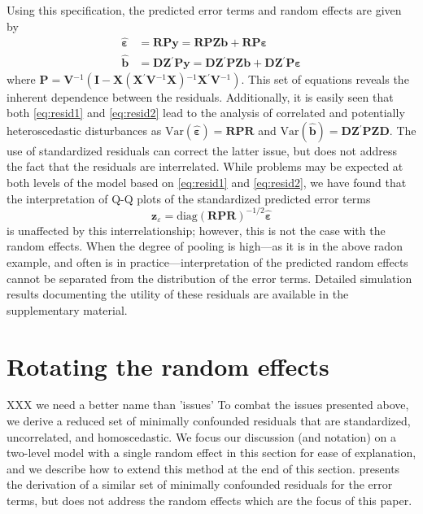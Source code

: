\documentclass{article} %
\newcommand{\hh}[1]{{\color{orange} #1}}
\newcommand{\al}[1]{{\color{red} #1}}
\newcommand{\inv}{\ensuremath{^{-1}}}
\newcommand{\trans}{\ensuremath{^\prime}}
\newcommand{\var}{\ensuremath{\mathrm{Var}}}
\begin{document}
Using this specification, the predicted error terms and random effects are given by 
%
\begin{align}
\widehat{\bm{\varepsilon}} &= \bm{RPy} = \bm{RPZb} + \bm{RP \varepsilon} \label{eq:resid1}\\
\widehat{\bm{b}} &= \bm{DZ}\trans \bm{Py} = \bm{DZ}\trans \bm{PZb} + \bm{DZ}\trans \bm{P \varepsilon} \label{eq:resid2}
\end{align}
%
where $\bm{P} = \bm{V}\inv( \bm{I} - \bm{X} (\bm{X}\trans \bm{V}\inv \bm{X})\inv \bm{X}\trans \bm{V}\inv)$. This  set of equations %
reveals the inherent dependence between the residuals.
Additionally, it is easily seen that both \eqref{eq:resid1} and \eqref{eq:resid2} lead to the analysis of correlated and potentially heteroscedastic disturbances as $\var(\widehat{\bm{\varepsilon}}) = \bm{RPR}$ and $\var(\widehat{\bm{b}}) = \bm{DZ}\trans \bm{PZD}$.
\al{
The use of standardized residuals can correct the latter issue, but does not address the fact that the residuals are interrelated. While problems may be expected at both levels of the model based on \eqref{eq:resid1} and \eqref{eq:resid2}, we have found that the interpretation of Q-Q plots of the standardized predicted error terms
%
\[
\bm{z}_{\varepsilon} =  \text{diag} \left(\bm{RPR} \right)^{-1/2} \widehat{\bm{\varepsilon}}
\]
%
is unaffected by this interrelationship; however, this is not the case with the random effects.  When the degree of pooling is high---as it is in the above radon example, and often is in practice---interpretation of the predicted random effects cannot be separated from the distribution of the error terms. Detailed simulation results \hh{documenting} the utility of  these residuals are available in the supplementary material.
}


\section{Rotating the random effects}\label{sec:rotate}
\hh{XXX we need a better name than 'issues'}
To combat the issues presented above, we derive a reduced set of minimally confounded residuals that are standardized, uncorrelated, and homoscedastic. \al{We focus our discussion (and notation) on a two-level model with a single random effect in this section for ease of explanation, and we describe how to extend this method at the end of this section.} \cite{HildenMinton:1995wh} presents the derivation of a similar set of minimally confounded residuals for the error terms, but does not address the random effects which are the focus of this paper. 
\end{document}
